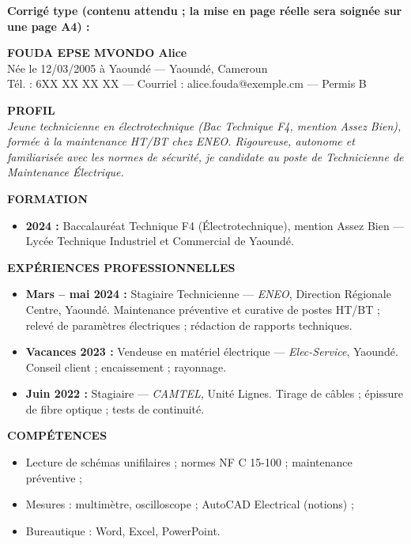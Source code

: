 \documentclass[11pt]{article}
\begin{document}
\begin{corrige}
\textbf{Corrigé type (contenu attendu ; la mise en page réelle sera soignée sur une page A4) :}

\begin{center}
\textbf{FOUDA EPSE MVONDO Alice}\\
Née le 12/03/2005 à Yaoundé — Yaoundé, Cameroun\\
Tél. : 6XX XX XX XX — Courriel : alice.fouda@exemple.cm — Permis B
\end{center}

\textbf{PROFIL}\\
\emph{Jeune technicienne en électrotechnique (Bac Technique F4, mention Assez Bien), formée à la maintenance HT/BT chez ENEO. Rigoureuse, autonome et familiarisée avec les normes de sécurité, je candidate au poste de Technicienne de Maintenance Électrique.}

\textbf{FORMATION}
\begin{itemize}
\item \textbf{2024 :} Baccalauréat Technique F4 (Électrotechnique), mention Assez Bien — Lycée Technique Industriel et Commercial de Yaoundé.
\end{itemize}

\textbf{EXPÉRIENCES PROFESSIONNELLES}
\begin{itemize}
\item \textbf{Mars -- mai 2024 :} Stagiaire Technicienne — \emph{ENEO}, Direction Régionale Centre, Yaoundé. Maintenance préventive et curative de postes HT/BT ; relevé de paramètres électriques ; rédaction de rapports techniques.
\item \textbf{Vacances 2023 :} Vendeuse en matériel électrique — \emph{Elec-Service}, Yaoundé. Conseil client ; encaissement ; rayonnage.
\item \textbf{Juin 2022 :} Stagiaire — \emph{CAMTEL}, Unité Lignes. Tirage de câbles ; épissure de fibre optique ; tests de continuité.
\end{itemize}

\textbf{COMPÉTENCES}
\begin{itemize}
\item Lecture de schémas unifilaires ; normes NF C 15-100 ; maintenance préventive ;
\item Mesures : multimètre, oscilloscope ; AutoCAD Electrical (notions) ;
\item Bureautique : Word, Excel, PowerPoint.
\end{itemize}


\end{corrige}
\end{document}
